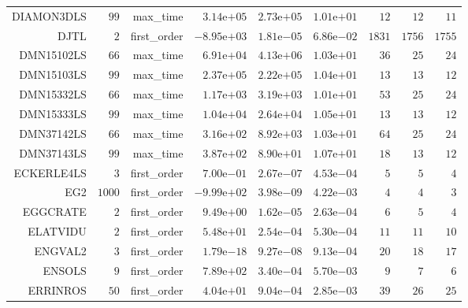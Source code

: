 \begin{longtable}{rrrrrrrrr}
DIAMON3DLS & \(    99\) & max\_time & \( 3.14\)e\(+05\) & \( 2.73\)e\(+05\) & \( 1.01\)e\(+01\) & \(    12\) & \(    12\) & \(    11\) \\
DJTL & \(     2\) & first\_order & \(-8.95\)e\(+03\) & \( 1.81\)e\(-05\) & \( 6.86\)e\(-02\) & \(  1831\) & \(  1756\) & \(  1755\) \\
DMN15102LS & \(    66\) & max\_time & \( 6.91\)e\(+04\) & \( 4.13\)e\(+06\) & \( 1.03\)e\(+01\) & \(    36\) & \(    25\) & \(    24\) \\
DMN15103LS & \(    99\) & max\_time & \( 2.37\)e\(+05\) & \( 2.22\)e\(+05\) & \( 1.04\)e\(+01\) & \(    13\) & \(    13\) & \(    12\) \\
DMN15332LS & \(    66\) & max\_time & \( 1.17\)e\(+03\) & \( 3.19\)e\(+03\) & \( 1.01\)e\(+01\) & \(    53\) & \(    25\) & \(    24\) \\
DMN15333LS & \(    99\) & max\_time & \( 1.04\)e\(+04\) & \( 2.64\)e\(+04\) & \( 1.05\)e\(+01\) & \(    13\) & \(    13\) & \(    12\) \\
DMN37142LS & \(    66\) & max\_time & \( 3.16\)e\(+02\) & \( 8.92\)e\(+03\) & \( 1.03\)e\(+01\) & \(    64\) & \(    25\) & \(    24\) \\
DMN37143LS & \(    99\) & max\_time & \( 3.87\)e\(+02\) & \( 8.90\)e\(+01\) & \( 1.07\)e\(+01\) & \(    18\) & \(    13\) & \(    12\) \\
ECKERLE4LS & \(     3\) & first\_order & \( 7.00\)e\(-01\) & \( 2.67\)e\(-07\) & \( 4.53\)e\(-04\) & \(     5\) & \(     5\) & \(     4\) \\
EG2 & \(  1000\) & first\_order & \(-9.99\)e\(+02\) & \( 3.98\)e\(-09\) & \( 4.22\)e\(-03\) & \(     4\) & \(     4\) & \(     3\) \\
EGGCRATE & \(     2\) & first\_order & \( 9.49\)e\(+00\) & \( 1.62\)e\(-05\) & \( 2.63\)e\(-04\) & \(     6\) & \(     5\) & \(     4\) \\
ELATVIDU & \(     2\) & first\_order & \( 5.48\)e\(+01\) & \( 2.54\)e\(-04\) & \( 5.30\)e\(-04\) & \(    11\) & \(    11\) & \(    10\) \\
ENGVAL2 & \(     3\) & first\_order & \( 1.79\)e\(-18\) & \( 9.27\)e\(-08\) & \( 9.13\)e\(-04\) & \(    20\) & \(    18\) & \(    17\) \\
ENSOLS & \(     9\) & first\_order & \( 7.89\)e\(+02\) & \( 3.40\)e\(-04\) & \( 5.70\)e\(-03\) & \(     9\) & \(     7\) & \(     6\) \\
ERRINROS & \(    50\) & first\_order & \( 4.04\)e\(+01\) & \( 9.04\)e\(-04\) & \( 2.85\)e\(-03\) & \(    39\) & \(    26\) & \(    25\) \\

\end{longtable}
